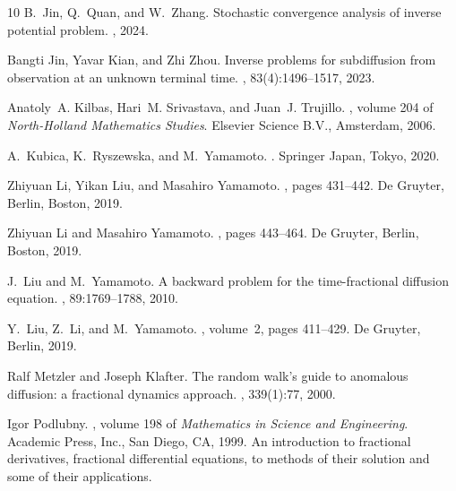 \documentclass[11pt]{article}
\numberwithin{equation}{section}
\begin{document}
\begin{thebibliography}{10}
B.~Jin, Q.~Quan, and W.~Zhang.
\newblock Stochastic convergence analysis of inverse potential problem.
, 2024.

Bangti Jin, Yavar Kian, and Zhi Zhou.
\newblock Inverse problems for subdiffusion from observation at an unknown
  terminal time.
, 83(4):1496--1517, 2023.

Anatoly~A. Kilbas, Hari~M. Srivastava, and Juan~J. Trujillo.
,
  volume 204 of {\em North-Holland Mathematics Studies}.
\newblock Elsevier Science B.V., Amsterdam, 2006.

A.~Kubica, K.~Ryszewska, and M.~Yamamoto.
.
\newblock Springer Japan, Tokyo, 2020.

Zhiyuan Li, Yikan Liu, and Masahiro Yamamoto.
, pages 431--442.
\newblock De Gruyter, Berlin, Boston, 2019.

Zhiyuan Li and Masahiro Yamamoto.
, pages 443--464.
\newblock De Gruyter, Berlin, Boston, 2019.

J.~Liu and M.~Yamamoto.
\newblock A backward problem for the time-fractional diffusion equation.
, 89:1769--1788, 2010.

Y.~Liu, Z.~Li, and M.~Yamamoto.
, volume~2, pages 411--429.
\newblock De Gruyter, Berlin, 2019.

Ralf Metzler and Joseph Klafter.
\newblock The random walk's guide to anomalous diffusion: a fractional dynamics
  approach.
, 339(1):77, 2000.

Igor Podlubny.
, volume 198 of {\em
  Mathematics in Science and Engineering}.
\newblock Academic Press, Inc., San Diego, CA, 1999.
\newblock An introduction to fractional derivatives, fractional differential
  equations, to methods of their solution and some of their applications.


\end{thebibliography}
\end{document}
